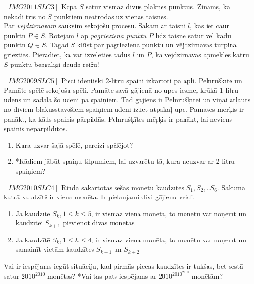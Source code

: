 \begin{problem}
$[IMO2011SLC3]$
Kopa  $S$ satur vismaz divus plaknes punktus. Zināms, ka nekādi trīs no $S$ punktiem neatrodas uz vienas taisnes.\\
Par \textit{vējdzirnavām} sauksim sekojošu procesu. Sākam ar taisni $l$, kas iet caur punktu $P\in S$. Rotējam $l$ ap \textit{pagrieziena punktu} $P$ līdz taisne satur vēl kādu punktu $Q \in S$. Tagad $S$ kļūst par pagrieziena punktu un vējdzirnavas turpina griezties.
Pierādiet, ka var izvelēties tādus $l$ un $P$, ka vējdzirnavas apmeklēs katru $S$ punktu bezgalīgi daudz reižu!
\end{problem}

\begin{problem}
$[IMO2009SLC5]$
Pieci identiski 2-litru spaiņi izkārtoti pa apli. Pelnrušķīte un Pamāte spēlē sekojošu spēli. Pamāte savā gājienā no upes iesmeļ krūkā 1 litru ūdens un sadala šo ūdeni pa spaiņiem. Tad gājiens ir Pelnrušķītei un viņai atļauts no diviem blakusstāvošiem spaiņiem ūdeni izliet atpakaļ upē. Pamātes mērķis ir panākt, ka kāds spainis pārpildās. Pelnrušķītes mēŗķis ir panākt, lai neviens spainis nepārpildītos.
\begin{enumerate}
\item Kura uzvar šajā spēlē, pareizi spēlējot?
\item *Kādiem jābūt spaiņu tilpumiem, lai uzvarētu tā, kura neuzvar ar 2-litru spaiņiem?
\end{enumerate}
\end{problem}

\begin{problem}
$[IMO2010SLC4]$
Rindā sakārtotas sešas monētu kaudzītes $S_1, S_2 ,.. S_6$. Sākumā katrā kaudzītē ir viena monēta. Ir pieļaujami divi gājienu veidi:
\renewcommand{\theenumi}{\roman{enumi}}
\begin{enumerate}
\item Ja kaudzītē $S_k, 1\leq k \leq 5$, ir vismaz viena monēta, to monētu var noņemt un kaudzītei $S_{k+1}$ pievienot divas monētas
\item Ja kaudzītē $S_k, 1\leq k \leq 4$, ir vismaz viena monēta, to monētu var noņemt un samainīt vietām kaudzītes $S_{k+1}$ un $S_{k+2}$
\end{enumerate}
Vai ir iespējams iegūt situāciju, kad pirmās piecas kaudzītes ir tukšas, bet sestā satur $2010^{2010}$ monētas? *Vai tas pats iespējams ar $2010^{2010^{2010}}$ monētām?
\end{problem}


